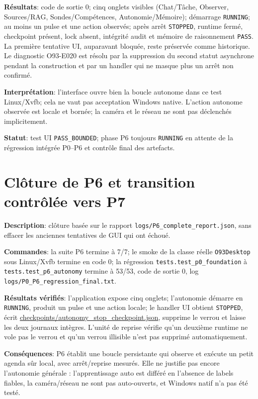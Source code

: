 \documentclass[11pt,a4paper,oneside]{report}
\begin{document}
\textbf{Résultats}: code de sortie 0; cinq onglets visibles (Chat/Tâche, Observer, Sources/RAG, Sondes/Compétences, Autonomie/Mémoire); démarrage \texttt{RUNNING}; au moins un pulse et une action observés; après arrêt \texttt{STOPPED}, runtime fermé, checkpoint présent, lock absent, intégrité audit et mémoire de raisonnement \texttt{PASS}. La première tentative UI, auparavant bloquée, reste préservée comme historique. Le diagnostic O93-E020 est résolu par la suppression du second statut asynchrone pendant la construction et par un handler qui ne masque plus un arrêt non confirmé.

\textbf{Interprétation}: l'interface ouvre bien la boucle autonome dans ce test Linux/Xvfb; cela ne vaut pas acceptation Windows native. L'action autonome observée est locale et bornée; la caméra et le réseau ne sont pas déclenchés implicitement.

\textbf{Statut}: test UI \texttt{PASS\_BOUNDED}; phase P6 toujours \texttt{RUNNING} en attente de la régression intégrée P0--P6 et contrôle final des artefacts.


\section{Clôture de P6 et transition contrôlée vers P7}
\textbf{Description}: clôture basée sur le rapport \texttt{logs/P6\_complete\_report.json}, sans effacer les anciennes tentatives de GUI qui ont échoué.

\textbf{Commandes}: la suite P6 termine à 7/7; le smoke de la classe réelle \texttt{O93Desktop} sous Linux/Xvfb termine en code 0; la régression \texttt{tests.test\_p0\_foundation} à \texttt{tests.test\_p6\_autonomy} termine à 53/53, code de sortie 0, log \texttt{logs/P0\_P6\_regression\_final.txt}.

\textbf{Résultats vérifiés}: l'application expose cinq onglets; l'autonomie démarre en \texttt{RUNNING}, produit un pulse et une action locale; le handler UI obtient \texttt{STOPPED}, écrit \url{checkpoints/autonomy_stop_checkpoint.json}, supprime le verrou et laisse les deux journaux intègres. L'unité de reprise vérifie qu'un deuxième runtime ne vole pas le verrou et qu'un verrou illisible n'est pas supprimé automatiquement.

\textbf{Conséquences}: P6 établit une boucle persistante qui observe et exécute un petit agenda sûr local, avec arrêt/reprise mesurés. Elle ne justifie pas encore l'autonomie générale : l'apprentissage auto est différé en l'absence de labels fiables, la caméra/réseau ne sont pas auto-ouverts, et Windows natif n'a pas été testé.
\end{document}
